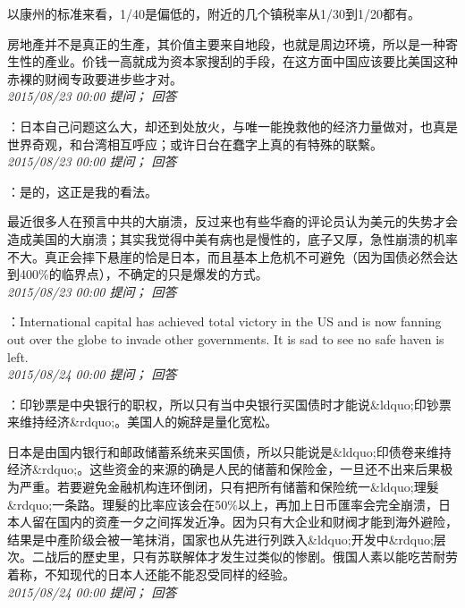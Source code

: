 \documentclass[twocolumn]{ctexart}
\begin{document}
以康州的标准来看，1/40是偏低的，附近的几个镇税率从1/30到1/20都有。

房地產并不是真正的生產，其价值主要来自地段，也就是周边环境，所以是一种寄生性的產业。价钱一高就成为资本家搜刮的手段，在这方面中国应该要比美国这种赤裸的财阀专政要进步些才对。\\

\textit{\hfill\noindent\small 2015/08/23 00:00 提问； 回答}

：日本自己问题这么大，却还到处放火，与唯一能挽救他的经济力量做对，也真是世界奇观，和台湾相互呼应；或许日台在蠢字上真的有特殊的联繫。\\

\textit{\hfill\noindent\small 2015/08/23 00:00 提问； 回答}

：是的，这正是我的看法。

最近很多人在预言中共的大崩溃，反过来也有些华裔的评论员认为美元的失势才会造成美国的大崩溃；其实我觉得中美有病也是慢性的，底子又厚，急性崩溃的机率不大。真正会摔下悬崖的恰是日本，而且基本上危机不可避免（因为国债必然会达到400\%的临界点），不确定的只是爆发的方式。\\

\textit{\hfill\noindent\small 2015/08/23 00:00 提问； 回答}

：International capital has achieved total victory in the US and is now fanning out over the globe to invade other governments. It is sad to see no safe haven is left.\\

\textit{\hfill\noindent\small 2015/08/24 00:00 提问； 回答}

：印钞票是中央银行的职权，所以只有当中央银行买国债时才能说\&ldquo;印钞票来维持经济\&rdquo;。美国人的婉辞是量化宽松。

日本是由国内银行和邮政储蓄系统来买国债，所以只能说是\&ldquo;印债卷来维持经济\&rdquo;。这些资金的来源的确是人民的储蓄和保险金，一旦还不出来后果极为严重。若要避免金融机构连环倒闭，只有把所有储蓄和保险统一\&ldquo;理髮\&rdquo;一条路。理髮的比率应该会在50\%以上，再加上日币匯率会完全崩溃，日本人留在国内的资產一夕之间挥发近净。因为只有大企业和财阀才能到海外避险，结果是中產阶级会被一笔抹消，国家也从先进行列跌入\&ldquo;开发中\&rdquo;层次。二战后的歷史里，只有苏联解体才发生过类似的惨剧。俄国人素以能吃苦耐劳着称，不知现代的日本人还能不能忍受同样的经验。\\

\textit{\hfill\noindent\small 2015/08/24 00:00 提问； 回答}
\end{document}
